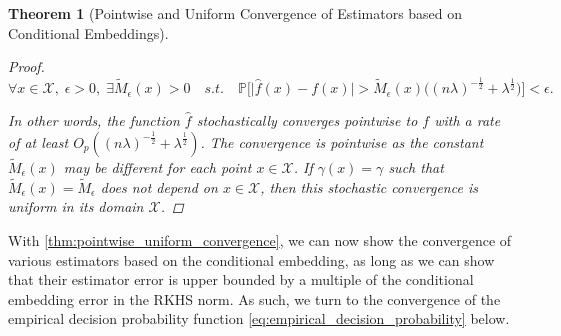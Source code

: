 \documentclass{article}
\newtheorem{theorem}{Theorem}[section]
\begin{document}
\begin{theorem}[Pointwise and Uniform Convergence of Estimators based on Conditional Embeddings]
\begin{proof}
			\begin{equation}
				\forall x \in \mathcal{X}, \; \epsilon > 0, \; \exists \tilde{M}_{\epsilon}(x) > 0 \quad s.t. \quad \mathbb{P}\Big[\big| \hat{f}(x) - f(x) \big| > \tilde{M}_{\epsilon}(x) \Big((n \lambda)^{-\frac{1}{2}} + \lambda^{\frac{1}{2}}\Big)\Big] < \epsilon.
			\end{equation}
	
			In other words, the function $\hat{f}$ stochastically converges pointwise to $f$ with a rate of at least $O_{p}((n \lambda)^{-\frac{1}{2}} + \lambda^{\frac{1}{2}})$. The convergence is pointwise as the constant $\tilde{M}_{\epsilon}(x)$ may be different for each point $x \in \mathcal{X}$. If $\gamma(x) = \gamma$ such that $\tilde{M}_{\epsilon}(x) = \tilde{M}_{\epsilon}$ does not depend on $x \in \mathcal{X}$, then this stochastic convergence is uniform in its domain $\mathcal{X}$.
		\end{proof}
		
	\end{theorem}
	
	With \cref{thm:pointwise_uniform_convergence}, we can now show the convergence of various estimators based on the conditional embedding, as long as we can show that their estimator error is upper bounded by a multiple of the conditional embedding error in the RKHS norm. As such, we turn to the convergence of the empirical decision probability function \eqref{eq:empirical_decision_probability} below.
\end{document}
